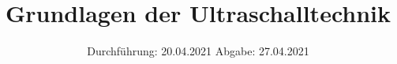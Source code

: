 

\subject{US1}
\title{Grundlagen der Ultraschalltechnik}
\date{%
  Durchführung: 20.04.2021
  \hspace{3em}
  Abgabe: 27.04.2021
}



\maketitle
\thispagestyle{empty}
\tableofcontents
\newpage







\printbibliography{}



